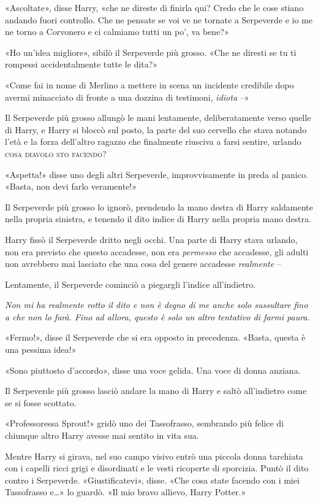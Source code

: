 «Ascoltate», disse Harry, «che ne direste di finirla qui? Credo che le cose stiano andando fuori controllo. Che ne pensate se voi ve ne tornate a Serpeverde e io me ne torno a Corvonero e ci calmiamo tutti un po’, va bene?»

«Ho un’idea migliore», sibilò il Serpeverde più grosso. «Che ne diresti se tu ti rompessi accidentalmente tutte le dita?»

«Come fai in nome di Merlino a mettere in scena un incidente credibile dopo avermi minacciato di fronte a una dozzina di testimoni, \textit{idiota} –»

Il Serpeverde più grosso allungò le mani lentamente, deliberatamente verso quelle di Harry, e Harry si bloccò sul posto, la parte del suo cervello che stava notando l’età e la forza dell’altro ragazzo che finalmente riusciva a farsi sentire, urlando \textsc{cosa diavolo sto facendo}?

«Aspetta!» disse uno degli altri Serpeverde, improvvisamente in preda al panico. «Basta, non devi farlo veramente!»

Il Serpeverde più grosso lo ignorò, prendendo la mano destra di Harry saldamente nella propria sinistra, e tenendo il dito indice di Harry nella propria mano destra.

Harry fissò il Serpeverde dritto negli occhi. Una parte di Harry stava urlando, non era previsto che questo accadesse, non era \textit{permesso} che accadesse, gli adulti non avrebbero mai lasciato che una cosa del genere accadesse \textit{realmente} –

Lentamente, il Serpeverde cominciò a piegargli l’indice all’indietro.

\textit{Non mi ha realmente rotto il dito e non è degno di me anche solo sussultare fino a che non lo farà. Fino ad allora, questo è solo un altro tentativo di farmi paura.}

«Fermo!», disse il Serpeverde che si era opposto in precedenza. «Basta, questa è una pessima idea!»

«Sono piuttosto d’accordo», disse una voce gelida. Una voce di donna anziana.

Il Serpeverde più grosso lasciò andare la mano di Harry e saltò all’indietro come se si fosse scottato.

«Professoressa Sprout!» gridò uno dei Tassofrasso, sembrando più felice di chiunque altro Harry avesse mai sentito in vita sua.

Mentre Harry si girava, nel suo campo visivo entrò una piccola donna tarchiata con i capelli ricci grigi e disordinati e le vesti ricoperte di sporcizia. Puntò il dito contro i Serpeverde. «Giustificatevi», disse. «Che cosa state facendo con i miei Tassofrasso e…» lo guardò. «Il mio bravo allievo, Harry Potter.»

